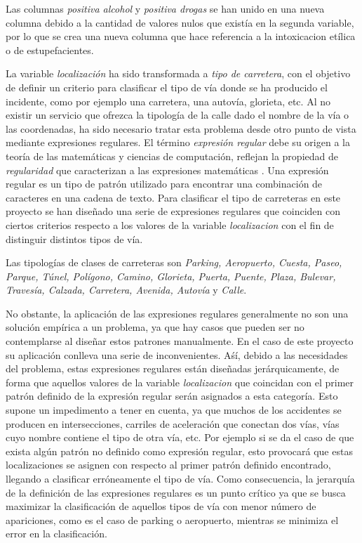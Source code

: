 \begin{enumerate}
                    Las columnas \textit{positiva alcohol} y \textit{positiva drogas} se han unido en una nueva columna debido a la cantidad de valores nulos que existía en la segunda variable, por lo que se crea una nueva columna que hace referencia a la intoxicacion etílica o de estupefacientes.
  

                    La variable \textit{localización} ha sido transformada a \textit{tipo de carretera}, con el objetivo de definir un criterio para clasificar el tipo de vía donde se ha producido el incidente, como por ejemplo una carretera, una autovía, glorieta, etc. Al no existir un servicio que ofrezca la tipología de la calle dado el nombre de la vía o las coordenadas, ha sido necesario tratar esta problema desde otro punto de vista mediante expresiones regulares. El término \textit{expresión regular} debe su origen a la teoría de las matemáticas y ciencias de computación, reflejan la propiedad de \textit{regularidad} que caracterizan a las expresiones matemáticas \cite{RegeXBook}. Una expresión regular es un tipo de patrón utilizado para encontrar una combinación de caracteres en una cadena de texto. Para clasificar el tipo de carreteras en este proyecto se han diseñado una serie de expresiones regulares que coinciden con ciertos criterios respecto a los valores de la variable \textit{localizacion} con el fin de distinguir distintos tipos de vía.


                    Las tipologías de clases de carreteras son \textit{Parking, Aeropuerto, Cuesta, Paseo, Parque, Túnel, Polígono, Camino, Glorieta, Puerta, Puente, Plaza, Bulevar, Travesía, Calzada, Carretera, Avenida, Autovía} y \textit{Calle}.


                    No obstante, la aplicación de las expresiones regulares generalmente no son una solución empírica a un problema, ya que hay casos que pueden ser no contemplarse al diseñar estos patrones manualmente. En el caso de este proyecto su aplicación conlleva una serie de inconvenientes. Aśí, debido a las necesidades del problema, estas expresiones regulares están diseñadas jerárquicamente, de forma que aquellos valores de la variable \textit{localizacion} que coincidan con el primer patrón definido de la expresión regular serán asignados a esta categoría. Esto supone un impedimento a tener en cuenta, ya que muchos de los accidentes se producen en intersecciones, carriles de aceleración que conectan dos vías, vías cuyo nombre contiene el tipo de otra vía, etc. Por ejemplo si se da el caso de que exista algún patrón no definido como expresión regular, esto provocará que estas localizaciones se asignen con respecto al primer patrón definido encontrado, llegando a clasificar erróneamente el tipo de vía. Como consecuencia, la jerarquía de la definición de las expresiones regulares es un punto crítico ya que se busca maximizar la clasificación de aquellos tipos de vía con menor número de apariciones, como es el caso de parking o aeropuerto, mientras se minimiza el error en la clasificación.



\end{enumerate}
